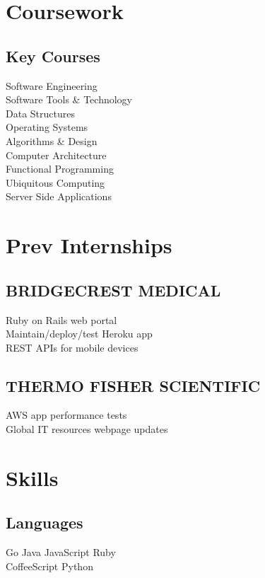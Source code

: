 \documentclass[]{deedy-resume-openfont}
\begin{document}
\begin{minipage}[t]{0.33\textwidth}

\section{Coursework}
\subsection{Key Courses}
Software Engineering \\
Software Tools \& Technology \\
Data Structures \\
Operating Systems \\
Algorithms \& Design \\
Computer Architecture \\
Functional Programming \\
Ubiquitous Computing \\
Server Side Applications \\
\sectionsep


\section{Prev Internships}
\subsection{BRIDGECREST MEDICAL}
Ruby on Rails web portal \\
Maintain/deploy/test Heroku app \\
REST APIs for mobile devices \\
\sectionsep
\subsection{THERMO FISHER SCIENTIFIC}
AWS app performance tests \\
Global IT resources webpage updates


\section{Skills}
\subsection{Languages}
Go \textbullet{} Java \textbullet{} JavaScript \textbullet{} Ruby \\
CoffeeScript \textbullet{} Python
\sectionsep

\end{minipage}
\end{document}
